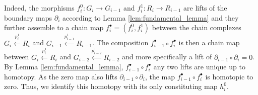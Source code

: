 %
Indeed, the morphisms $f^0_i:G_i\rightarrow G_{i-1}$ and $f^1_i:R_i\rightarrow R_{i-1}$ are lifts of the boundary maps $\partial_i$ according to Lemma \ref{lem:fundamental_lemma} and they further assemble to a chain map $f^\bullet_i=(f^0_i,f^1_i)$ between the chain complexes $G_i\xleftarrow{p^1_i}R_i$ and $G_{i-1}\xleftarrow{p^1_{i-1}} R_{i-1}$. The composition $f^\bullet_{i-1}\circ f^\bullet_i$ is then a chain map between $G_i\xleftarrow{p^1_i}R_i$ and $G_{i-2}\xleftarrow{p^1_{i-2}}R_{i-2}$ and more specifically a lift of $\partial_{i-1}\circ\partial_i=0$. By Lemma \ref{lem:fundamental_lemma}, $f^\bullet_{i-1}\circ f^\bullet_i$ any two lifts are unique up to homotopy. As the zero map also lifts $\partial_{i-1}\circ \partial_i$, the map $f^\bullet_{i-1}\circ f^\bullet_i$ is homotopic to zero. Thus, we identify this homotopy with its only constituting map $h^0_i$. 
%
